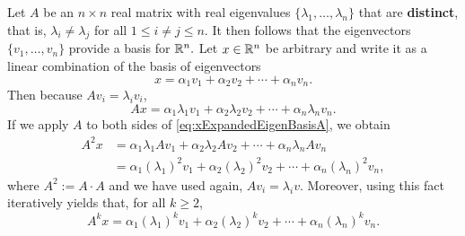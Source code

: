 \vspace*{.2cm}
\begin{tcolorbox}[sharp corners, colback=green!30, colframe=green!80!blue, title=\textcolor{red}{\Large \bf Utility of Eigenvalues and Eigenvectors:} \textbf{\Large They Explain how a Square Matrix acts on a Vector}]
Let $A$ be an $n \times n$ real matrix with real eigenvalues $\{ \lambda_1,\ldots, \lambda_n \}$ that are \textbf{distinct}, that is, $\lambda_i \neq \lambda_j $ for all $1 \le i \neq j \le n$. It then follows that the eigenvectors $\{ v_1,\ldots,v_n \}$ provide a basis for $\mathbb R^n.$ Let $x\in \mathbb R^n$ be arbitrary and write it as a linear combination of the basis of eigenvectors
\begin{equation}
    \label{eq:xExpandedEigenBasis}
    x = \alpha_ 1 v_1 + \alpha_2 v_2 + \cdots + \alpha_n v_n.
\end{equation}
Then because $Av_i = \lambda_i v_i$,
\begin{equation}
    \label{eq:xExpandedEigenBasisA}
   A x = \alpha_ 1 \lambda_1 v_1 + \alpha_2 \lambda_2 v_2 + \cdots +\alpha_n  \lambda_n v_n.
\end{equation}
If we apply $A$ to both sides of \eqref{eq:xExpandedEigenBasisA}, we obtain
\begin{equation}
    \label{eq:xExpandedEigenBasisA2}
    \begin{aligned}
       A^2 x &= \alpha_ 1 \lambda_1 A v_1 + \alpha_2 \lambda_2 A v_2 + \cdots +\alpha_n  \lambda_n Av_n \\
       &= \alpha_ 1 (\lambda_1)^2 v_1 + \alpha_2 (\lambda_2)^2  v_2 + \cdots +\alpha_n  (\lambda_n)^2 v_n,
    \end{aligned}
\end{equation}
where $A^2:= A \cdot A$ and we have used again, $A v_i = \lambda_i v$. 
Moreover, using this fact iteratively yields that, for all $k \ge 2$,
\begin{equation}
    \label{eq:xExpandedEigenBasisB}
   A^k x = \alpha_ 1 (\lambda_1)^k v_1 + \alpha_2 (\lambda_2)^k v_2 + \cdots +\alpha_n  (\lambda_n)^k v_n.
\end{equation}

\end{tcolorbox}
\vspace*{.3cm}

